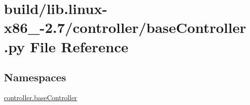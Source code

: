\hypertarget{build_2lib_8linux-x86__64-2_87_2controller_2baseController_8py}{}\section{build/lib.linux-\/x86\+\_-\/2.7/controller/base\+Controller.py File Reference}
\label{build_2lib_8linux-x86__64-2_87_2controller_2baseController_8py}
\subsection*{Namespaces}
\begin{DoxyCompactItemize}
\item 
 \hyperlink{namespacecontroller_1_1baseController}{controller.\+base\+Controller}
\end{DoxyCompactItemize}
